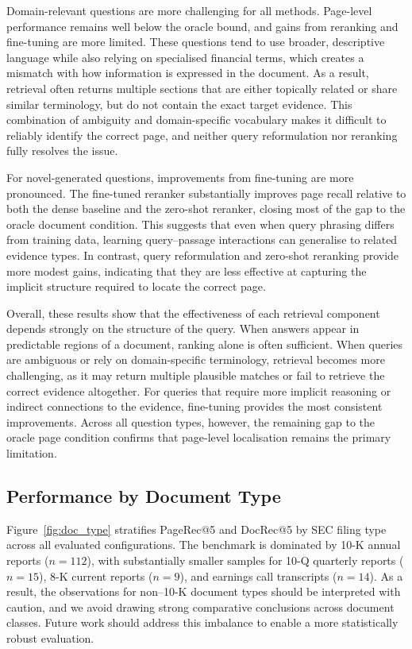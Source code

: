 \documentclass[12pt,twoside,maitrise]{dms}
\theoremstyle{definition}
\numberwithin{equation}{section}
\numberwithin{table}{chapter}
\numberwithin{figure}{chapter}
\begin{document}
Domain-relevant questions are more challenging for all methods. Page-level performance
remains well below the oracle bound, and gains from reranking and fine-tuning are more
limited. These questions tend to use broader, descriptive language while also relying on
specialised financial terms, which creates a mismatch with how information is expressed
in the document. As a result, retrieval often returns multiple sections that are either
topically related or share similar terminology, but do not contain the exact target
evidence. This combination of ambiguity and domain-specific vocabulary makes it difficult
to reliably identify the correct page, and neither query reformulation nor reranking fully
resolves the issue.

For novel-generated questions, improvements from fine-tuning are more pronounced. The
fine-tuned reranker substantially improves page recall relative to both the dense baseline
and the zero-shot reranker, closing most of the gap to the oracle document condition.
This suggests that even when query phrasing differs from training data, learning
query–passage interactions can generalise to related evidence types. In contrast, query
reformulation and zero-shot reranking provide more modest gains, indicating that they are
less effective at capturing the implicit structure required to locate the correct page.

Overall, these results show that the effectiveness of each retrieval component depends
strongly on the structure of the query. When answers appear in predictable regions of a
document, ranking alone is often sufficient. When queries are ambiguous or rely on
domain-specific terminology, retrieval becomes more challenging, as it may return multiple
plausible matches or fail to retrieve the correct evidence altogether. For queries that
require more implicit reasoning or indirect connections to the evidence, fine-tuning
provides the most consistent improvements. Across all question types, however, the
remaining gap to the oracle page condition confirms that page-level localisation remains
the primary limitation.

\subsection{Performance by Document Type}
\label{sec:doctype_retrieval}


Figure~\ref{fig:doc_type} stratifies PageRec@5 and DocRec@5 by SEC filing type across
all evaluated configurations. The benchmark is dominated by 10-K annual reports
($n=112$), with substantially smaller samples for 10-Q quarterly reports ($n=15$),
8-K current reports ($n=9$), and earnings call transcripts ($n=14$). As a result,
the observations for non–10-K document types should be interpreted with caution,
and we avoid drawing strong comparative conclusions across document classes.
Future work should address this imbalance to enable a more statistically robust
evaluation.
\end{document}
